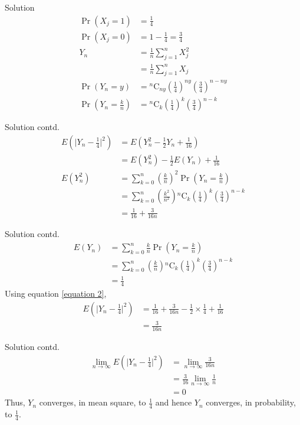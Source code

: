 \documentclass{beamer}
\newcommand{\comb}[2]{{}^{#1}\mathrm{C}_{#2}}
\providecommand{\brak}[1]{\ensuremath{\left(#1\right)}}
\providecommand{\abs}[1]{\vert#1\vert}
\begin{document}
\begin{frame}{Solution}
\begin{align}
    \Pr{(X_j=1)} &= \frac{1}{4}
    \\\Pr{(X_j=0)} &= 1 - \frac{1}{4} = \frac{3}{4}
    \\Y_n &= \frac{1}{n} \sum_{j=1}^{n}X_j^2 
    \\&= \frac{1}{n} \sum_{j=1}^{n}X_j
    \\\Pr{(Y_n = y)} &= \comb{n}{ny} \brak{\frac{1}{4}}^{ny} \brak{\frac{3}{4}}^{n-ny}
    \\\Pr{(Y_n = \frac{k}{n})} &= \comb{n}{k} \brak{\frac{1}{4}}^{k} \brak{\frac{3}{4}}^{n-k}
\end{align}
\end{frame}
\begin{frame}{Solution contd.}
\begin{align}
    E\brak{\abs{Y_n-\frac{1}{4}}^2} &= E\brak{Y_n^2 - \frac{1}{2}Y_n + \frac{1}{16}}
    \\&= E(Y_n^2) - \frac{1}{2}E(Y_n) + \frac{1}{16} \label{equation 0}
    \\E(Y_n^2) &= \sum_{k=0}^n\brak{\frac{k}{n}}^2\Pr{\brak{Y_n=\frac{k}{n}}}
    \\&= \sum_{k=0}^{n} \brak{\frac{k^2}{n^2}}\comb{n}{k} \brak{\frac{1}{4}}^{k} \brak{\frac{3}{4}}^{n-k}
    \\&=  \frac{1}{16} + \frac{3}{16n} \label{equation 2}
\end{align}
\end{frame}
\begin{frame}{Solution contd.}
\begin{align}
    E(Y_n) &= \sum_{k=0}^n\frac{k}{n}\Pr{\brak{Y_n=\frac{k}{n}}}
    \\&= \sum_{k=0}^{n} \brak{\frac{k}{n}}\comb{n}{k} \brak{\frac{1}{4}}^{k} \brak{\frac{3}{4}}^{n-k}
    \\&= \frac{1}{4} \label{equation 3}
\end{align}
Using equation \eqref{equation 2},
\begin{align}
    E\brak{\abs{Y_n-\frac{1}{4}}^2} &= \frac{1}{16}+ \frac{3}{16n}-\frac{1}{2}\times\frac{1}{4} + \frac{1}{16}
    \\&= \frac{3}{16n}
\end{align}
\end{frame}
\begin{frame}{Solution contd.}
 \begin{align}
    \lim_{n\rightarrow \infty} E\brak{\abs{Y_n-\frac{1}{4}}^2} &=  \lim_{n\rightarrow \infty}  \frac{3}{16n}
    \\&= \frac{3}{16}\lim_{n\rightarrow \infty}\frac{1}{n}
    \\&= 0
\end{align}
Thus, $Y_n$ converges, in mean square, to $\frac{1}{4}$ and hence $Y_n$ converges, in probability, to $\frac{1}{4}$.
\end{frame}
\end{document}
